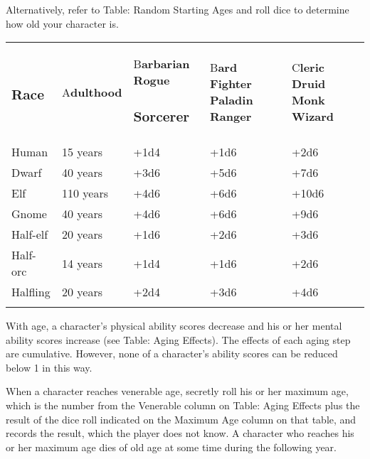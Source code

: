 \documentclass{article}
\begin{document}
Alternatively, refer to Table: Random Starting Ages and roll dice to determine 
how old your character is.

\vspace{12pt}
\begin{tabular}{|>{\raggedright}p{32pt}|>{\raggedright}p{44pt}|>{\raggedright}p{43pt}|>{\raggedright}p{31pt}|>{\raggedright}p{31pt}|}
\hline
\multicolumn{5}{|p{183pt}|}{T\textbf{able: Random Starting Ages}}\tabularnewline
\hline
\subsubsection*{R\textbf{ace}} & A\textbf{dulthood} & B\textbf{arbarian}\linebreak{}
\textbf{Rogue}\linebreak{}
\subsubsection*{\textbf{Sorcerer}} & B\textbf{ard}\linebreak{}
\textbf{Fighter}\linebreak{}
\textbf{Paladin}\linebreak{}
\textbf{Ranger} & C\textbf{leric}\linebreak{}
\textbf{Druid}\linebreak{}
\textbf{Monk}\linebreak{}
\textbf{Wizard}\tabularnewline
\hline
Human & 15 years & +1d4 & +1d6 & +2d6\tabularnewline
\hline
Dwarf & 40 years & +3d6 & +5d6 & +7d6\tabularnewline
\hline
Elf & 110 years & +4d6 & +6d6 & +10d6\tabularnewline
\hline
Gnome & 40 years & +4d6 & +6d6 & +9d6\tabularnewline
\hline
Half-elf & 20 years & +1d6 & +2d6 & +3d6\tabularnewline
\hline
Half-orc & 14 years & +1d4 & +1d6 & +2d6\tabularnewline
\hline
Halfling & 20 years & +2d4 & +3d6 & +4d6\tabularnewline
\hline
 &  &  &  & \tabularnewline
\hline
\end{tabular}

With age, a character's physical ability scores decrease and his or her mental 
ability scores increase (see Table: Aging Effects). The effects of each aging step 
are cumulative. However, none of a character's ability scores can be reduced below 
1 in this way.

When a character reaches venerable age, secretly roll his or her maximum age, which 
is the number from the Venerable column on Table: Aging Effects plus the result 
of the dice roll indicated on the Maximum Age column on that table, and records 
the result, which the player does not know. A character who reaches his or her 
maximum age dies of old age at some time during the following year.
\end{document}
